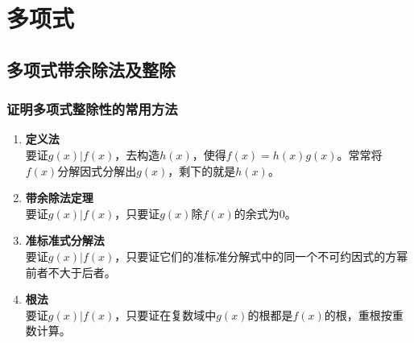 \chapter{多项式}

\section{多项式带余除法及整除}

\subsection{证明多项式整除性的常用方法}
\begin{enumerate}
	\item \textbf{定义法} \\
	要证$g(x)|f(x)$，去构造$h(x)$，使得$f(x)=h(x)g(x)$。常常将$f(x)$分解因式分解出$g(x)$，剩下的就是$h(x)$。
	\item \textbf{带余除法定理} \\
	要证$g(x)|f(x)$，只要证$g(x)$除$f(x)$的余式为$0$。
	\item \textbf{准标准式分解法} \\
	要证$g(x)|f(x)$，只要证它们的准标准分解式中的同一个不可约因式的方幂前者不大于后者。
	\item \textbf{根法} \\
	要证$g(x)|f(x)$，只要证在复数域中$g(x)$的根都是$f(x)$的根，重根按重数计算。
\end{enumerate}


